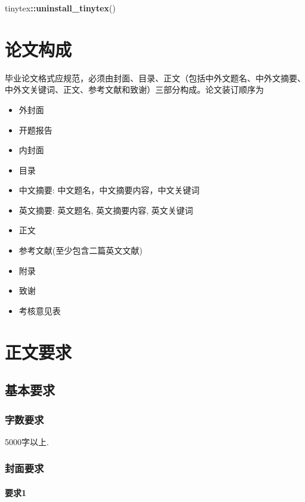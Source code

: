 \documentclass[12pt,a4paper,zihao=-4,UTF8]{book}
\newenvironment{Shaded}{\begin{snugshade}}{\end{snugshade}}
\newcommand{\KeywordTok}[1]{\textcolor[rgb]{0.13,0.29,0.53}{\textbf{#1}}}
\newcommand{\OperatorTok}[1]{\textcolor[rgb]{0.81,0.36,0.00}{\textbf{#1}}}
\newcommand{\NormalTok}[1]{#1}
\begin{document}
\begin{Shaded}
\begin{Highlighting}[]
\NormalTok{tinytex}\OperatorTok{::}\KeywordTok{uninstall_tinytex}\NormalTok{()}
\end{Highlighting}
\end{Shaded}

\chapter{论文构成}

毕业论文格式应规范，必须由封面、目录、正文（包括中外文题名、中外文摘要、中外文关键词、正文、参考文献和致谢）三部分构成。论文装订顺序为

\begin{itemize}
\item
  外封面
\item
  开题报告
\item
  内封面
\item
  目录
\item
  中文摘要: 中文题名，中文摘要内容，中文关键词
\item
  英文摘要: 英文题名, 英文摘要内容, 英文关键词
\item
  正文
\item
  参考文献(至少包含二篇英文文献)
\item
  附录
\item
  致谢
\item
  考核意见表
\end{itemize}

\chapter{正文要求}

\section{基本要求}

\subsection{字数要求}

5000字以上.

\subsection{封面要求}

\subsubsection{要求1}\label{1}
\end{document}
